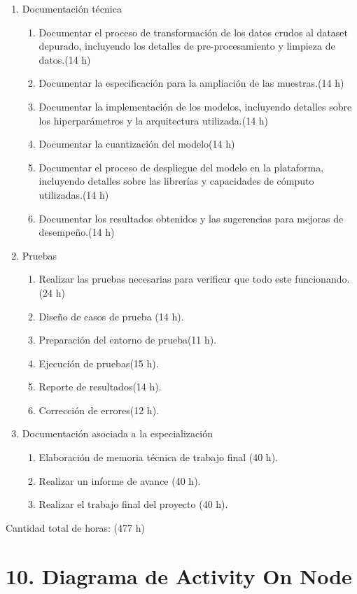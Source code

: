 \documentclass[
11pt, %
codirector, %
]{charter}
\begin{document}
\begin{enumerate}
\begin{enumerate}
	\end{enumerate}
\item Documentación técnica
	\begin{enumerate}
	\item Documentar el proceso de transformación de los datos crudos al dataset depurado, incluyendo los detalles de pre-procesamiento y limpieza de datos.(14 h)
	\item Documentar la especificación para la ampliación de las muestras.(14 h)
	\item Documentar la implementación de los modelos, incluyendo detalles sobre los hiperparámetros y la arquitectura utilizada.(14 h)
	\item Documentar la cuantización del modelo(14 h)
	\item Documentar el proceso de despliegue del modelo en la plataforma, incluyendo detalles sobre las librerías y capacidades de cómputo utilizadas.(14 h)
	\item Documentar los resultados obtenidos y las sugerencias para mejoras de desempeño.(14 h)
	\end{enumerate}
\item Pruebas
	\begin{enumerate}
	\item Realizar las pruebas necesarias para verificar que todo este funcionando.(24 h)
	\item Diseño de casos de prueba (14 h).
	\item Preparación del entorno de prueba(11 h).
	\item Ejecución de pruebas(15 h).
	\item Reporte de resultados(14 h).
	\item Corrección de errores(12 h).
	
	\end{enumerate}
	\item Documentación asociada a la especialización
		\begin{enumerate}
			\item Elaboración de memoria técnica de trabajo final (40 h).
			\item Realizar un informe de avance (40 h).
			\item Realizar  el trabajo final del proyecto (40 h).
		\end{enumerate}
\end{enumerate}

Cantidad total de horas: (477 h)




\section{10. Diagrama de Activity On Node}
\label{sec:AoN}
	
\end{document}
